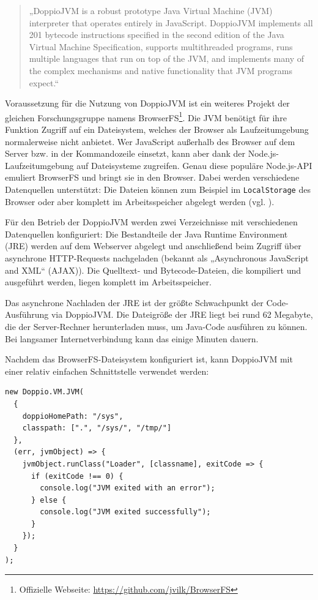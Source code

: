 \begin{quotation}
„DoppioJVM is a robust prototype Java Virtual Machine (JVM) interpreter
that operates entirely in JavaScript. DoppioJVM implements all 201 bytecode instructions specified in the second edition of the Java Virtual Machine Specification, supports multithreaded programs, runs multiple languages that run on top of the JVM, and implements many of the complex mechanisms and native functionality that JVM programs expect.“
\end{quotation}

Voraussetzung für die Nutzung von DoppioJVM ist ein weiteres Projekt der gleichen Forschungsgruppe namens BrowserFS\footnote{Offizielle Webseite: \url{https://github.com/jvilk/BrowserFS}}. Die JVM benötigt für ihre Funktion Zugriff auf ein Dateisystem, welches der Browser als Laufzeitumgebung normalerweise nicht anbietet. Wer JavaScript außerhalb des Browser auf dem Server bzw. in der Kommandozeile einsetzt, kann aber dank der Node.js-Laufzeitumgebung auf Dateisysteme zugreifen. Genau diese populäre Node.js-API emuliert BrowserFS und bringt sie in den Browser. Dabei werden verschiedene Datenquellen unterstützt: Die Dateien können zum Beispiel im \texttt{LocalStorage} des Browser oder aber komplett im Arbeitsspeicher abgelegt werden (vgl. \cite{web:browserfs_docs}).

Für den Betrieb der DoppioJVM werden zwei Verzeichnisse mit verschiedenen Datenquellen konfiguriert: Die Bestandteile der Java Runtime Environment (JRE) werden auf dem Webserver abgelegt und anschließend beim Zugriff über asynchrone HTTP-Requests nachgeladen (bekannt als „Asynchronous JavaScript and XML“ (AJAX)). Die Quelltext- und Bytecode-Dateien, die kompiliert und ausgeführt werden, liegen komplett im Arbeitsspeicher.

Das asynchrone Nachladen der JRE ist der größte Schwachpunkt der Code-Ausführung via DoppioJVM. Die Dateigröße der JRE liegt bei rund 62 Megabyte, die der Server-Rechner herunterladen muss, um Java-Code ausführen zu können. Bei langsamer Internetverbindung kann das einige Minuten dauern.

Nachdem das BrowserFS-Dateisystem konfiguriert ist, kann DoppioJVM mit einer relativ einfachen Schnittstelle verwendet werden:

\begin{minipage}{\linewidth}
\begin{lstlisting}[caption={Instanziierung der DoppioJVM (aus: src/server/actions/doppio.js).}]
new Doppio.VM.JVM(
  {
    doppioHomePath: "/sys",
    classpath: [".", "/sys/", "/tmp/"]
  },
  (err, jvmObject) => {
    jvmObject.runClass("Loader", [classname], exitCode => {
      if (exitCode !== 0) {
        console.log("JVM exited with an error");
      } else {
        console.log("JVM exited successfully");
      }
    });
  }
);
\end{lstlisting}
\end{minipage}

